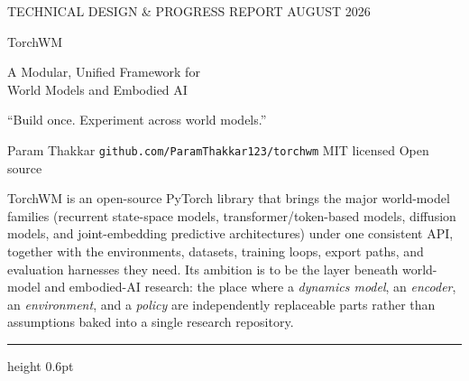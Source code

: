 \documentclass[10pt,a4paper]{article}
\newcommand{\sectionhead}[1]{\vspace{1mm}{\large\displayfont\color{ink} #1}\par\vspace{2mm}}
\begin{document}
\thispagestyle{fancy}


\vspace*{5mm}
{\color{white}
  {\footnotesize\displayfont\color{accent!35!white}TECHNICAL DESIGN \& PROGRESS REPORT \quad\textbullet\quad AUGUST 2026}\par
  \vspace{6mm}
  {\fontsize{40}{44}\selectfont\displayfont TorchWM}\par
  \vspace{3mm}
  {\fontsize{14.5}{18}\selectfont\lightfont\color{white}A Modular, Unified Framework for\\World Models and Embodied AI}\par
  \vspace{7mm}
  {\large\displayfont\color{accent!35!white}“Build once. Experiment across world models.”}\par
  \vspace{6mm}
  {\footnotesize\color{white!62!ink}Param Thakkar \quad\textbullet\quad \texttt{github.com/ParamThakkar123/torchwm} \quad\textbullet\quad MIT licensed \quad\textbullet\quad Open source}
}
\vspace{12mm}

\sectionhead{What TorchWM is}
TorchWM is an open-source PyTorch library that brings the major world-model families (recurrent
state-space models, transformer/token-based models, diffusion models, and joint-embedding predictive
architectures) under one consistent API, together with the environments, datasets, training loops,
export paths, and evaluation harnesses they need. Its ambition is to be the layer beneath
world-model and embodied-AI research: the place where a \emph{dynamics model}, an \emph{encoder},
an \emph{environment}, and a \emph{policy} are independently replaceable parts rather than
assumptions baked into a single research repository.

\vspace{3mm}
{\color{rule}\hrule height 0.6pt}
\vspace{3.5mm}
\end{document}
